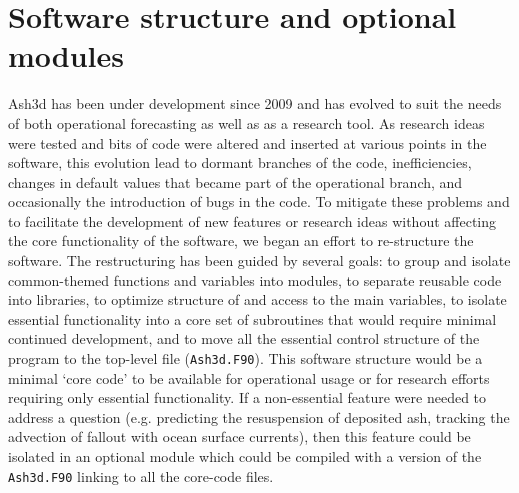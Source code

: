\chapter{Software structure and optional modules}\label{ChapSoftwareStructure}
Ash3d has been under development since 2009 and has evolved to suit
the needs of both operational forecasting as well as as a research tool.
As research ideas were tested and bits of code were altered and inserted
at various points in the software, this evolution lead to dormant
branches of the code, inefficiencies, changes in default values that became
part of the operational branch, and occasionally the introduction of 
bugs in the code.  To mitigate these problems and to facilitate the
development of new features or research ideas without affecting the core
functionality of the software, we began an effort to re-structure the
software.  The restructuring has been guided by several goals:
to group and isolate common-themed functions and variables into modules,
to separate reusable code into libraries,
to optimize structure of and access to the main variables,
to isolate essential functionality into a core set of subroutines that
would require minimal continued development, and
to move all the essential control structure of the program to 
the top-level file (\texttt{Ash3d.F90}).
This software structure would be a minimal `core code' to be available for
operational usage or for research efforts requiring only essential functionality.
If a non-essential feature were needed to address a question (e.g. predicting
the resuspension of deposited ash, tracking the advection of fallout with
ocean surface currents), then this feature could be isolated in an optional
module which could be compiled with a version of the \texttt{Ash3d.F90} linking
to all the core-code files.

